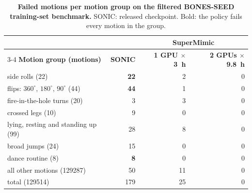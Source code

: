 \begin{table}[H]
\centering
\footnotesize
\begin{tabular}{@{}lrrr@{}}
\toprule
 & & \multicolumn{2}{c}{\textbf{SuperMimic}} \\
\cmidrule(l){3-4}
\textbf{Motion group (motions)} & \textbf{SONIC} & \textbf{1 GPU $\times$ \qty{3}{\hour}} & \textbf{2 GPUs $\times$ \qty{9.8}{\hour}} \\
\midrule
side rolls (22) & \textbf{22} & 2 & 0 \\
flips: $360^\circ$, $180^\circ$, $90^\circ$ (44) & \textbf{44} & 1 & 0 \\
fire-in-the-hole turns (20) & 3 & 3 & 0 \\
crossed legs (10) & 9 & 0 & 0 \\
lying, resting and standing up (99) & 28 & 8 & 0 \\
\midrule
broad jumps (24) & 15 & 0 & 0 \\
dance routine (8) & \textbf{8} & 0 & 0 \\
all other motions (\num{129287}) & 50 & 11 & 0 \\
\midrule
total (\num{129514}) & 179 & 25 & 0 \\
\bottomrule
\end{tabular}
\vspace{0.6em}
\caption{\textbf{Failed motions per motion group on the filtered BONES-SEED training-set benchmark.} SONIC: released checkpoint. Bold: the policy fails every motion in the group.}
\label{tab:failed-motion-stats}
\end{table}

